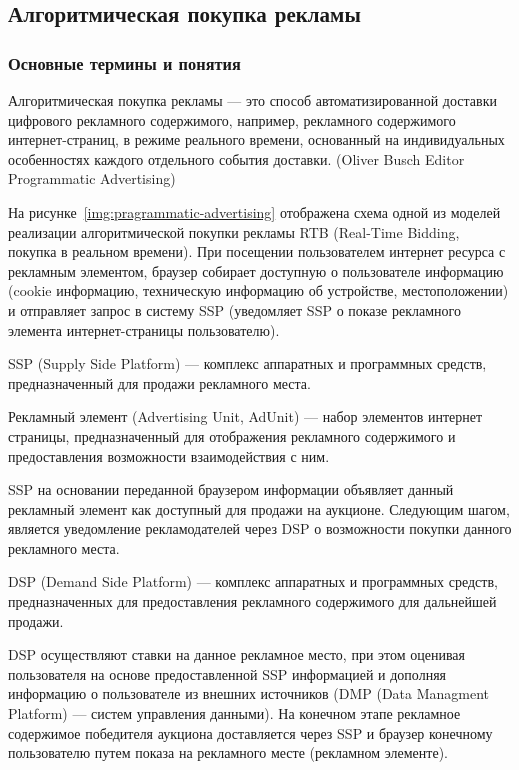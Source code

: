 \subsection{Алгоритмическая покупка рекламы}
\subsubsection{Основные термины и понятия}

Алгоритмическая покупка рекламы --- это способ автоматизированной доставки цифрового рекламного содержимого,
например, рекламного содержимого интернет-страниц, в режиме реального времени, основанный на индивидуальных 
особенностях каждого отдельного события доставки. (Oliver Busch Editor Programmatic Advertising)



На рисунке~\ref{img:pragrammatic-advertising} отображена схема одной из моделей реализации 
алгоритмической покупки рекламы RTB (Real-Time Bidding, покупка в реальном времени). При посещении пользователем интернет ресурса 
с рекламным элементом, браузер собирает доступную о пользователе информацию 
(cookie информацию, техническую информацию об устройстве, местоположении) и отправляет запрос в систему SSP 
(уведомляет SSP о показе рекламного элемента интернет-страницы пользователю).

SSP (Supply Side Platform) --- комплекс аппаратных и программных средств, предназначенный для продажи 
рекламного места.

Рекламный элемент (Advertising Unit, AdUnit) --- набор элементов интернет страницы, предназначенный для 
отображения рекламного содержимого и предоставления возможности взаимодействия с ним.

SSP на основании переданной браузером информации объявляет данный рекламный элемент как доступный для 
продажи на аукционе. Следующим шагом, является уведомление рекламодателей через DSP о возможности покупки
данного рекламного места.

DSP (Demand Side Platform) --- комплекс аппаратных и программных средств, предназначенных для предоставления
рекламного содержимого для дальнейшей продажи.

DSP осуществляют ставки на данное рекламное место, при этом оценивая пользователя на основе предоставленной
SSP информацией и дополняя информацию о пользователе из внешних источников (DMP (Data Managment Platform) --- 
систем управления данными). На конечном этапе рекламное содержимое победителя аукциона доставляется через SSP и
браузер конечному пользователю путем показа на рекламного месте (рекламном элементе).

